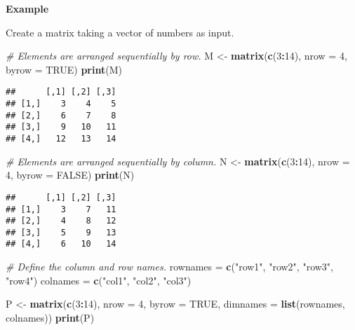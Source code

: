 \documentclass[
]{article}
\newenvironment{Shaded}{\begin{snugshade}}{\end{snugshade}}
\newcommand{\AttributeTok}[1]{\textcolor[rgb]{0.13,0.29,0.53}{#1}}
\newcommand{\CommentTok}[1]{\textcolor[rgb]{0.56,0.35,0.01}{\textit{#1}}}
\newcommand{\ConstantTok}[1]{\textcolor[rgb]{0.56,0.35,0.01}{#1}}
\newcommand{\DecValTok}[1]{\textcolor[rgb]{0.00,0.00,0.81}{#1}}
\newcommand{\FunctionTok}[1]{\textcolor[rgb]{0.13,0.29,0.53}{\textbf{#1}}}
\newcommand{\NormalTok}[1]{#1}
\newcommand{\OtherTok}[1]{\textcolor[rgb]{0.56,0.35,0.01}{#1}}
\newcommand{\SpecialCharTok}[1]{\textcolor[rgb]{0.81,0.36,0.00}{\textbf{#1}}}
\newcommand{\StringTok}[1]{\textcolor[rgb]{0.31,0.60,0.02}{#1}}
\begin{document}
\textbf{Example}

Create a matrix taking a vector of numbers as input.

\begin{Shaded}
\begin{Highlighting}[]
\CommentTok{\# Elements are arranged sequentially by row.}
\NormalTok{M }\OtherTok{\textless{}{-}} \FunctionTok{matrix}\NormalTok{(}\FunctionTok{c}\NormalTok{(}\DecValTok{3}\SpecialCharTok{:}\DecValTok{14}\NormalTok{), }\AttributeTok{nrow =} \DecValTok{4}\NormalTok{, }\AttributeTok{byrow =} \ConstantTok{TRUE}\NormalTok{)}
\FunctionTok{print}\NormalTok{(M)}
\end{Highlighting}
\end{Shaded}

\begin{verbatim}
##      [,1] [,2] [,3]
## [1,]    3    4    5
## [2,]    6    7    8
## [3,]    9   10   11
## [4,]   12   13   14
\end{verbatim}

\begin{Shaded}
\begin{Highlighting}[]
\CommentTok{\# Elements are arranged sequentially by column.}
\NormalTok{N }\OtherTok{\textless{}{-}} \FunctionTok{matrix}\NormalTok{(}\FunctionTok{c}\NormalTok{(}\DecValTok{3}\SpecialCharTok{:}\DecValTok{14}\NormalTok{), }\AttributeTok{nrow =} \DecValTok{4}\NormalTok{, }\AttributeTok{byrow =} \ConstantTok{FALSE}\NormalTok{)}
\FunctionTok{print}\NormalTok{(N)}
\end{Highlighting}
\end{Shaded}

\begin{verbatim}
##      [,1] [,2] [,3]
## [1,]    3    7   11
## [2,]    4    8   12
## [3,]    5    9   13
## [4,]    6   10   14
\end{verbatim}

\begin{Shaded}
\begin{Highlighting}[]
\CommentTok{\# Define the column and row names.}
\NormalTok{rownames }\OtherTok{=} \FunctionTok{c}\NormalTok{(}\StringTok{"row1"}\NormalTok{, }\StringTok{"row2"}\NormalTok{, }\StringTok{"row3"}\NormalTok{, }\StringTok{"row4"}\NormalTok{)}
\NormalTok{colnames }\OtherTok{=} \FunctionTok{c}\NormalTok{(}\StringTok{"col1"}\NormalTok{, }\StringTok{"col2"}\NormalTok{, }\StringTok{"col3"}\NormalTok{)}

\NormalTok{P }\OtherTok{\textless{}{-}} \FunctionTok{matrix}\NormalTok{(}\FunctionTok{c}\NormalTok{(}\DecValTok{3}\SpecialCharTok{:}\DecValTok{14}\NormalTok{), }\AttributeTok{nrow =} \DecValTok{4}\NormalTok{, }\AttributeTok{byrow =} \ConstantTok{TRUE}\NormalTok{, }\AttributeTok{dimnames =} \FunctionTok{list}\NormalTok{(rownames, colnames))}
\FunctionTok{print}\NormalTok{(P)}
\end{Highlighting}
\end{Shaded}
\end{document}

